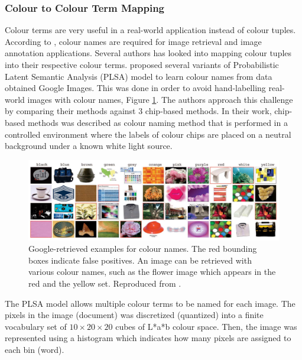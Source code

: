 \subsubsection{Colour to Colour Term Mapping}

Colour terms are very useful in a real-world application instead of colour tuples. According to \cite{van2009learning}, colour names are required for image retrieval and image annotation applications. 
Several authors has looked into mapping colour tuples into their respective colour terms.  proposed several variants of Probabilistic Latent Semantic Analysis (PLSA) model to learn colour names from data obtained Google Images. 
This was done in order to avoid hand-labelling real-world images with colour names, Figure \ref{fig:van20091}. The authors approach this challenge by comparing their methods against 3 chip-based methods. 
In their work, chip-based methods was described as colour naming method that is performed in a controlled environment where the labels of colour chips are placed on a neutral background under a known white light source.

\begin{figure}[hbt!]\centering
\includegraphics[width=1\textwidth]{image/lit/van20091.PNG}
\caption[Google-retrieved examples for colour names. The red bounding boxes indicate false positives. An image can be retrieved with various colour names, such as the flower image which appears in the red and the yellow set.]{Google-retrieved examples for colour names. The red bounding boxes indicate false positives. An image can be retrieved with various colour names, such as the flower image which appears in the red and the yellow set.  Reproduced from .}
\label{fig:van20091}
\end{figure}

The PLSA model allows multiple colour terms to be named for each image. The pixels in the image (document) was discretized (quantized) into a finite vocabulary set of $10 \times 20 \times 20$ cubes of L*a*b colour space. Then, the image was represented using a histogram which indicates how many pixels are assigned to each bin (word). 

